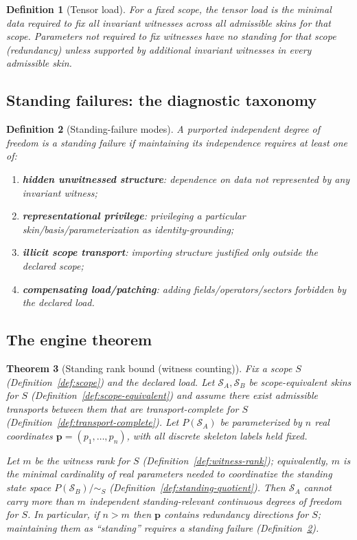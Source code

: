 \documentclass[11pt]{article}
\newtheorem{definition}{Definition}[section]
\newtheorem{theorem}[definition]{Theorem}
\theoremstyle{remark}
\newcommand{\Skin}{\mathcal{S}}
\begin{document}
\begin{definition}[Tensor load]\label{def:tensor-load}
For a fixed scope, the \emph{tensor load} is the minimal data required to fix all invariant witnesses
across all admissible skins for that scope. Parameters not required to fix witnesses have no standing
for that scope (redundancy) unless supported by additional invariant witnesses \emph{in every} admissible skin.
\end{definition}

\subsection{Standing failures: the diagnostic taxonomy}

\begin{definition}[Standing-failure modes]\label{def:failure}
A purported independent degree of freedom is a \emph{standing failure} if maintaining its independence
requires at least one of:
\begin{enumerate}[label=(\alph*),leftmargin=2.2em]
\item \textbf{hidden unwitnessed structure}: dependence on data not represented by any invariant witness;
\item \textbf{representational privilege}: privileging a particular skin/basis/parameterization as identity-grounding;
\item \textbf{illicit scope transport}: importing structure justified only outside the declared scope;
\item \textbf{compensating load/patching}: adding fields/operators/sectors forbidden by the declared load.
\end{enumerate}
\end{definition}

\subsection{The engine theorem}

\begin{theorem}[Standing rank bound (witness counting)]\label{thm:witness-counting}
Fix a scope $S$ (Definition~\ref{def:scope}) and the declared load.
Let $\Skin_A,\Skin_B$ be scope-equivalent skins for $S$ (Definition~\ref{def:scope-equivalent}) and assume
there exist admissible transports between them that are transport-complete for $S$
(Definition~\ref{def:transport-complete}).
Let $P(\Skin_A)$ be parameterized by $n$ real coordinates $\mathbf{p}=(p_1,\dots,p_n)$, with all discrete
skeleton labels held fixed.

Let $m$ be the witness rank for $S$ (Definition~\ref{def:witness-rank}); equivalently, $m$ is the minimal
cardinality of real parameters needed to coordinatize the standing state space $P(\Skin_B)/\!\sim_S$
(Definition~\ref{def:standing-quotient}).
Then $\Skin_A$ cannot carry more than $m$ independent standing-relevant continuous degrees of freedom for $S$.
In particular, if $n>m$ then $\mathbf{p}$ contains redundancy directions for $S$; maintaining them as
``standing'' requires a standing failure (Definition~\ref{def:failure}).
\end{theorem}
\end{document}
